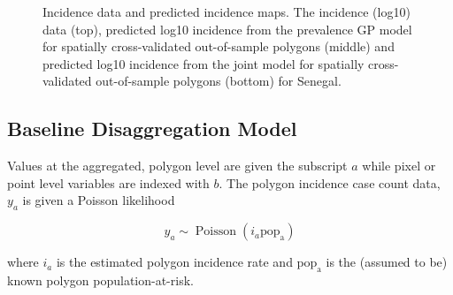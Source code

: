 \documentclass{statsoc}
\begin{document}
\begin{figure}[h!]
\caption{\label{predobsmapidn}
Incidence data and predicted incidence maps.
The incidence (log10) data (top), predicted log10 incidence from the prevalence GP model for spatially cross-validated out-of-sample polygons (middle) and predicted log10 incidence from the joint model for spatially cross-validated out-of-sample polygons (bottom) for Senegal.
}
\end{figure}



\subsection*{Baseline Disaggregation Model}

Values at the aggregated, polygon level are given the subscript $a$ while pixel or point level variables are indexed with $b$.
The polygon incidence case count data, $y_a$ is given a Poisson likelihood

$$y_a \sim \operatorname{Poisson}(i_a\mathrm{pop_a})$$

where $i_a$ is the estimated polygon incidence rate and $\mathrm{pop_a}$ is the (assumed to be) known polygon population-at-risk.
\end{document}
